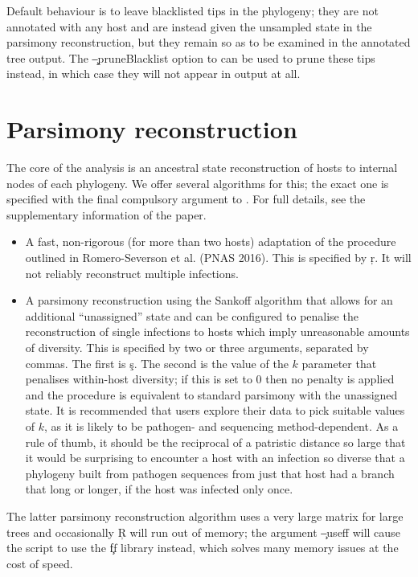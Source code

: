Default behaviour is to leave blacklisted tips in the phylogeny; they are not annotated with any host and are instead given the unsampled state in the parsimony reconstruction, but they remain so as to be examined in the annotated tree output.
The \c{--pruneBlacklist} option to \pat can be used to prune these tips instead, in which case they will not appear in output at all.

\section{Parsimony reconstruction} \label{sec:ParsimonyReconstruction}

The core of the \pat analysis is an ancestral state reconstruction of hosts to internal nodes of each phylogeny.
We offer several algorithms for this; the exact one is specified with the final compulsory argument to \pat.
For full details, see the supplementary information of the \p paper.
\begin{itemize}
\item A fast, non-rigorous (for more than two hosts) adaptation of the procedure outlined in Romero-Severson et al. (PNAS 2016).
This is specified by \c{r}.
It will not reliably reconstruct multiple infections.
\item A parsimony reconstruction using the Sankoff algorithm that allows for an additional ``unassigned'' state and can be configured to penalise the reconstruction of single infections to hosts which imply unreasonable amounts of diversity.
This is specified by two or three arguments, separated by commas.
The first is \c{s}.
The second is the value of the $k$ parameter that penalises within-host diversity; if this is set to 0 then no penalty is applied and the procedure is equivalent to standard parsimony with the unassigned state.
It is recommended that users explore their data to pick suitable values of $k$, as it is likely to be pathogen- and sequencing method-dependent. As a rule of thumb, it should be the reciprocal of a patristic distance so large that it would be surprising to encounter a host with an infection so diverse that a phylogeny built from pathogen sequences from just that host had a branch that long or longer, if the host was infected only once.
\end{itemize}
The latter parsimony reconstruction algorithm uses a very large matrix for large trees and occasionally \c{R} will run out of memory; the argument \c{--useff} will cause the script to use the \c{ff} library instead, which solves many memory issues at the cost of speed.


